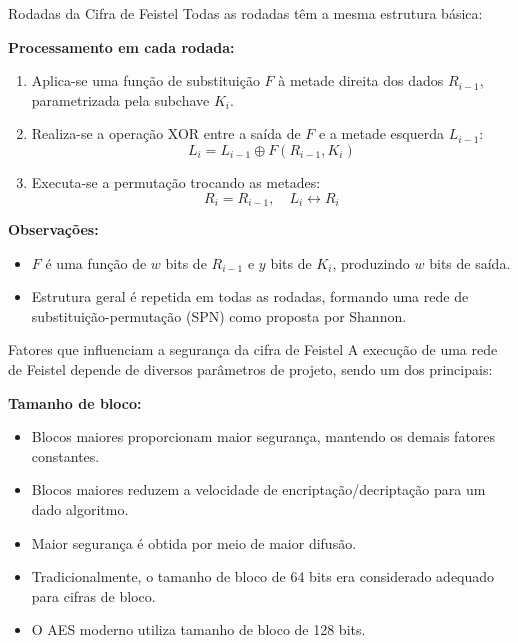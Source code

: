\begin{frame}{Rodadas da Cifra de Feistel}
Todas as rodadas têm a mesma estrutura básica:

\medskip
\textbf{Processamento em cada rodada:}
\begin{enumerate}
    \item Aplica-se uma função de substituição $F$ à metade direita dos dados $R_{i-1}$, parametrizada pela subchave $K_i$.
    \item Realiza-se a operação XOR entre a saída de $F$ e a metade esquerda $L_{i-1}$:
    \[
        L_i = L_{i-1} \oplus F(R_{i-1}, K_i)
    \]
    \item Executa-se a permutação trocando as metades:
    \[
        R_i = R_{i-1}, \quad L_i \leftrightarrow R_i
    \]
\end{enumerate}

\medskip
\textbf{Observações:}
\begin{itemize}
    \item $F$ é uma função de $w$ bits de $R_{i-1}$ e $y$ bits de $K_i$, produzindo $w$ bits de saída.
    \item Estrutura geral é repetida em todas as rodadas, formando uma rede de substituição-permutação (SPN) como proposta por Shannon.
\end{itemize}
\end{frame}

\begin{frame}{Fatores que influenciam a segurança da cifra de Feistel}
A execução de uma rede de Feistel depende de diversos parâmetros de projeto, sendo um dos principais:

\medskip
\textbf{Tamanho de bloco:}
\begin{itemize}
    \item Blocos maiores proporcionam maior segurança, mantendo os demais fatores constantes.
    \item Blocos maiores reduzem a velocidade de encriptação/decriptação para um dado algoritmo.
    \item Maior segurança é obtida por meio de maior difusão.
    \item Tradicionalmente, o tamanho de bloco de 64 bits era considerado adequado para cifras de bloco.
    \item O AES moderno utiliza tamanho de bloco de 128 bits.
\end{itemize}
\end{frame}

